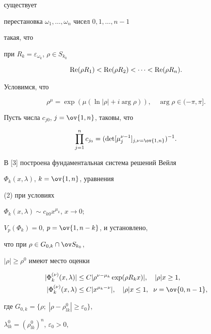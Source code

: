 существует


перестановка $\omega_1,\dotsc,\omega_n$ чисел $0,1,\dotsc,n-1$


такая, что


при $R_k=\varepsilon_{\omega_k}$, $\rho\in S_{k_0}$


$$


\re(\rho R_1)<\re(\rho R_2)<\dotsb <\re(\rho R_n).


$$


Условимся, что


$$


\rho^\mu=\exp(\mu(\ln|\rho|+i\arg\rho)),\quad


\arg\rho\in(-\pi,\pi].


$$





Пусть числа $c_{j0}$, $j=\ov{1,n}$, таковы, что


\begin{equation}


\prod^n_{j=1}c_{j_0}=


(\det[\mu^{\nu-1}_j]_{j,\nu=\ov{1,n}})^{-1}.


\end{equation}


В [3] построена фундаментальная система решений Вейля


$\Phi_k(x,\lambda)$, $k=\ov{1,n}$, уравнения


(2) при условиях


$\Phi_k(x,\lambda)\sim c_{k0}x^{\mu_k}$, $x\to 0$;


$V_p(\Phi_k)=0$, $p=\ov{1,n-k}$, и установлено,


что при $\rho\in G_{0,k}\cap\ov S_{k_0}$,


$|\rho|\ge\rho^0$ имеют место оценки


\begin{align*}


|\Phi^{(\nu)}_k(x,\lambda)|&\le C|\rho^{\nu-\mu_k}


\exp(\rho R_kx)|,\quad |\rho|x\ge 1,\\


|\Phi^{(\nu)}_k(x,\lambda)&\le C|x^{\mu_k-\nu}|,\quad


|\rho|x\le 1, \ \; \nu=\ov{0,n-1},


\end{align*}


где $G_{0,k}=\{\rho;\;|\rho-\rho^0_{lk}|\ge\varepsilon_0\}$,


$\lambda^0_{lk}=(\rho^0_{lk})^n$, $\varepsilon_0>0$,


